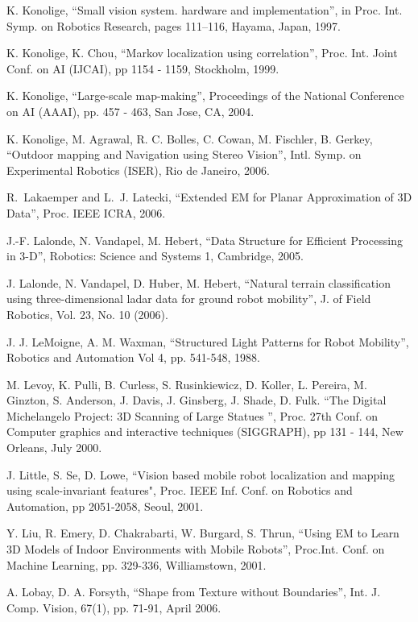 \documentclass[twocolumn,oneside]{book}
\begin{document}
\begin{thebibliography}{99}
K. Konolige,
``Small vision system. hardware and implementation'',
in Proc. Int. Symp. on Robotics Research, pages 111--116,
Hayama, Japan, 1997.

K. Konolige, K. Chou,
``Markov localization using correlation'',
Proc. Int. Joint Conf. on AI (IJCAI), pp 1154 - 1159, Stockholm, 1999.

K. Konolige,
``Large-scale map-making'',
Proceedings of the National Conference on AI (AAAI), pp. 457 - 463, San Jose, CA, 2004.

K. Konolige, M. Agrawal, R. C. Bolles, C. Cowan, M. Fischler, B. Gerkey,
``Outdoor mapping and Navigation using Stereo Vision'',
Intl. Symp. on Experimental Robotics (ISER), Rio de Janeiro, 2006.

R.~Lakaemper and L.~J. Latecki,
``Extended EM for Planar Approximation of 3D Data'',
Proc. IEEE ICRA, 2006.

J.-F. Lalonde, N. Vandapel, M. Hebert,
``Data Structure for Efficient Processing in 3-D'',
Robotics: Science and Systems 1, Cambridge, 2005.

J. Lalonde, N. Vandapel, D. Huber, M. Hebert,
``Natural terrain classification using three-dimensional ladar data
for ground robot mobility'',
J. of Field Robotics, Vol. 23, No. 10 (2006).

J. J. LeMoigne, A. M. Waxman, 
``Structured Light Patterns for Robot Mobility'',
Robotics and Automation Vol 4, pp. 541-548, 1988.

M. Levoy, K. Pulli, B. Curless, S. Rusinkiewicz, D. Koller, L. Pereira, M. Ginzton, S. Anderson, J. Davis, J. Ginsberg, J. Shade, D. Fulk.
``The Digital Michelangelo Project: 3D Scanning of Large Statues '',
Proc. 27th Conf. on Computer graphics and interactive techniques
(SIGGRAPH), pp 131 - 144, New Orleans, July 2000.

J. Little, S. Se, D. Lowe,
``Vision based mobile robot localization and mapping using scale-invariant features",
Proc. IEEE Inf. Conf. on Robotics and Automation, pp 2051-2058, Seoul, 2001.

Y. Liu, R. Emery, D. Chakrabarti, W. Burgard, S. Thrun, 
``Using EM to Learn 3D Models of Indoor Environments with Mobile
Robots'', 
Proc.Int. Conf. on Machine Learning, pp. 329-336, Williamstown, 2001.

A. Lobay, D. A. Forsyth, 
``Shape from Texture without Boundaries'',
Int. J. Comp. Vision, 67(1), pp. 71-91, April 2006.


\end{thebibliography}
\end{document}
